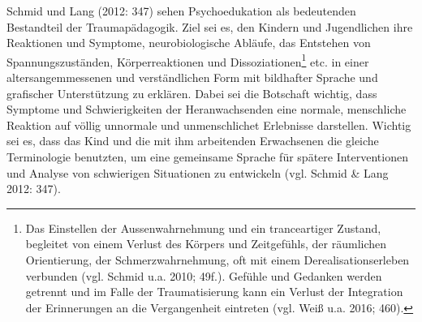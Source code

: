 Schmid und Lang (2012: 347) sehen Psychoedukation als bedeutenden Bestandteil der Traumap{\"a}dagogik. Ziel sei es, den Kindern und Jugendlichen ihre Reaktionen und Symptome, neurobiologische Abl{\"a}ufe, das Entstehen von Spannungszust{\"a}nden, K{\"o}rperreaktionen und Dissoziationen\footnote{Das Einstellen der Aussenwahrnehmung und ein tranceartiger Zustand, begleitet von einem Verlust des Körpers und Zeitgefühls, der räumlichen Orientierung, der Schmerzwahrnehmung, oft mit einem Derealisationserleben verbunden (vgl. Schmid u.a. 2010; 49f.). Gefühle und Gedanken werden getrennt und im Falle der Traumatisierung kann ein Verlust der Integration der Erinnerungen an die Vergangenheit eintreten (vgl. Weiß u.a. 2016; 460).} etc. in einer altersangemmessenen und verständlichen Form mit bildhafter Sprache und grafischer Unterstützung zu erklären. Dabei sei die Botschaft wichtig, dass Symptome und Schwierigkeiten der Heranwachsenden eine normale, menschliche Reaktion auf v{\"o}llig unnormale und unmenschlichet Erlebnisse darstellen. Wichtig sei es, dass das Kind und die mit ihm arbeitenden Erwachsenen die gleiche Terminologie benutzten, um eine gemeinsame Sprache für spätere Interventionen und Analyse von schwierigen Situationen zu entwickeln (vgl. Schmid \& Lang 2012: 347).

